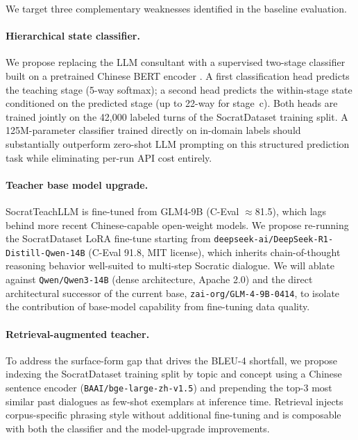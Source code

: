 \documentclass[11pt]{article}
\begin{document}
We target three complementary weaknesses identified in the baseline evaluation.

\paragraph{Hierarchical state classifier.}
We propose replacing the LLM consultant with a supervised two-stage classifier built on a pretrained Chinese BERT encoder \citep{devlin2019bert}. A first classification head predicts the teaching stage (5-way softmax); a second head predicts the within-stage state conditioned on the predicted stage (up to 22-way for stage~c). Both heads are trained jointly on the 42,000 labeled turns of the SocratDataset training split. A 125M-parameter classifier trained directly on in-domain labels should substantially outperform zero-shot LLM prompting on this structured prediction task while eliminating per-run API cost entirely.

\paragraph{Teacher base model upgrade.}
SocratTeachLLM is fine-tuned from GLM4-9B (C-Eval $\approx$81.5), which lags behind more recent Chinese-capable open-weight models. We propose re-running the SocratDataset LoRA fine-tune starting from \texttt{deepseek-ai/DeepSeek-R1-Distill-Qwen-14B} (C-Eval 91.8, MIT license), which inherits chain-of-thought reasoning behavior well-suited to multi-step Socratic dialogue. We will ablate against \texttt{Qwen/Qwen3-14B} (dense architecture, Apache 2.0) and the direct architectural successor of the current base, \texttt{zai-org/GLM-4-9B-0414}, to isolate the contribution of base-model capability from fine-tuning data quality.

\paragraph{Retrieval-augmented teacher.}
To address the surface-form gap that drives the BLEU-4 shortfall, we propose indexing the SocratDataset training split by topic and concept using a Chinese sentence encoder (\texttt{BAAI/bge-large-zh-v1.5}) and prepending the top-3 most similar past dialogues as few-shot exemplars at inference time. Retrieval injects corpus-specific phrasing style without additional fine-tuning and is composable with both the classifier and the model-upgrade improvements.

\end{document}

